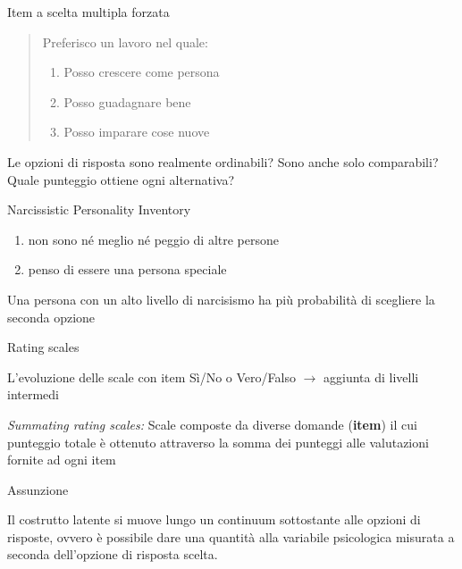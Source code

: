 \documentclass{beamer}
\begin{document}
\begin{frame}{Item a scelta multipla forzata}
	
	\begin{quote}
		
		Preferisco un lavoro nel quale: 
		
		\begin{enumerate}
			\item Posso crescere come persona
			\item Posso guadagnare bene
			\item Posso imparare cose nuove
		\end{enumerate}
	\end{quote}
	
	
	\vspace{2.5mm}
	Le opzioni di risposta sono realmente ordinabili? Sono anche solo comparabili? Quale punteggio ottiene ogni alternativa?
	

	\begin{exampleblock}{Narcissistic Personality Inventory}
		\begin{enumerate}
			\item non sono né meglio né peggio di altre persone
			\item penso di essere una persona speciale 
		\end{enumerate}
		

		Una persona con un alto livello di narcisismo ha più probabilità di scegliere la seconda opzione
	\end{exampleblock}
\end{frame}

\begin{frame}{Rating scales}
	
	L'evoluzione delle scale con item Sì/No o Vero/Falso $\rightarrow$ aggiunta di livelli intermedi
	
	\emph{Summating rating scales:} Scale composte da diverse domande (\textbf{item}) il cui punteggio totale è ottenuto attraverso la somma dei punteggi alle valutazioni fornite ad ogni item
	
	\begin{block}{Assunzione}
		
		Il costrutto latente si muove lungo un continuum sottostante alle opzioni di risposte, ovvero è possibile dare una quantità alla variabile psicologica misurata a seconda dell'opzione di risposta scelta. 
	\end{block}
	
	
\end{frame}
\end{document}

